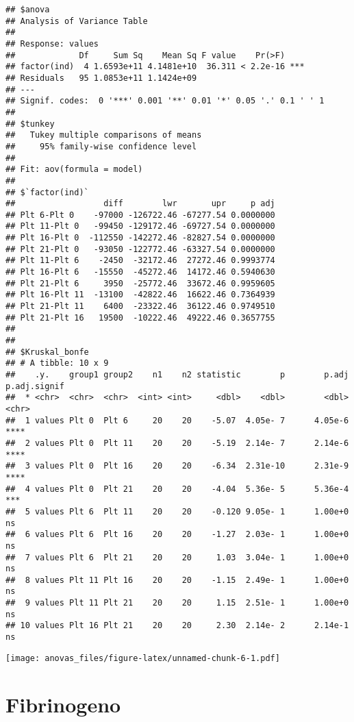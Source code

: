 \documentclass[
]{article}
\begin{document}
\begin{verbatim}
## $anova
## Analysis of Variance Table
## 
## Response: values
##             Df     Sum Sq    Mean Sq F value    Pr(>F)    
## factor(ind)  4 1.6593e+11 4.1481e+10  36.311 < 2.2e-16 ***
## Residuals   95 1.0853e+11 1.1424e+09                      
## ---
## Signif. codes:  0 '***' 0.001 '**' 0.01 '*' 0.05 '.' 0.1 ' ' 1
## 
## $tunkey
##   Tukey multiple comparisons of means
##     95% family-wise confidence level
## 
## Fit: aov(formula = model)
## 
## $`factor(ind)`
##                  diff        lwr       upr     p adj
## Plt 6-Plt 0    -97000 -126722.46 -67277.54 0.0000000
## Plt 11-Plt 0   -99450 -129172.46 -69727.54 0.0000000
## Plt 16-Plt 0  -112550 -142272.46 -82827.54 0.0000000
## Plt 21-Plt 0   -93050 -122772.46 -63327.54 0.0000000
## Plt 11-Plt 6    -2450  -32172.46  27272.46 0.9993774
## Plt 16-Plt 6   -15550  -45272.46  14172.46 0.5940630
## Plt 21-Plt 6     3950  -25772.46  33672.46 0.9959605
## Plt 16-Plt 11  -13100  -42822.46  16622.46 0.7364939
## Plt 21-Plt 11    6400  -23322.46  36122.46 0.9749510
## Plt 21-Plt 16   19500  -10222.46  49222.46 0.3657755
## 
## 
## $Kruskal_bonfe
## # A tibble: 10 x 9
##    .y.    group1 group2    n1    n2 statistic        p        p.adj p.adj.signif
##  * <chr>  <chr>  <chr>  <int> <int>     <dbl>    <dbl>        <dbl> <chr>       
##  1 values Plt 0  Plt 6     20    20    -5.07  4.05e- 7      4.05e-6 ****        
##  2 values Plt 0  Plt 11    20    20    -5.19  2.14e- 7      2.14e-6 ****        
##  3 values Plt 0  Plt 16    20    20    -6.34  2.31e-10      2.31e-9 ****        
##  4 values Plt 0  Plt 21    20    20    -4.04  5.36e- 5      5.36e-4 ***         
##  5 values Plt 6  Plt 11    20    20    -0.120 9.05e- 1      1.00e+0 ns          
##  6 values Plt 6  Plt 16    20    20    -1.27  2.03e- 1      1.00e+0 ns          
##  7 values Plt 6  Plt 21    20    20     1.03  3.04e- 1      1.00e+0 ns          
##  8 values Plt 11 Plt 16    20    20    -1.15  2.49e- 1      1.00e+0 ns          
##  9 values Plt 11 Plt 21    20    20     1.15  2.51e- 1      1.00e+0 ns          
## 10 values Plt 16 Plt 21    20    20     2.30  2.14e- 2      2.14e-1 ns
\end{verbatim}

\texttt{[image: anovas\_files/figure-latex/unnamed-chunk-6-1.pdf]}

\hypertarget{fibrinogeno}{%
\section{Fibrinogeno}\label{fibrinogeno}}
\end{document}
